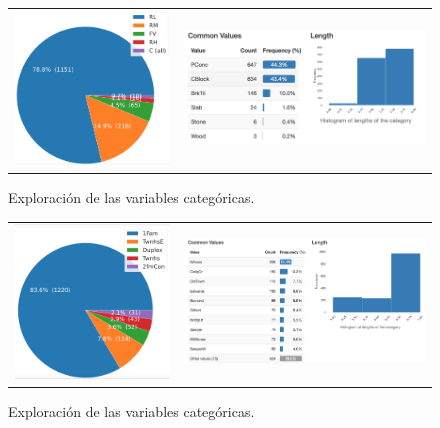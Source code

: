\begin{figure}[H]
	\centering
	\begin{tabular}{cc}
		\includegraphics[width=45mm]{Images/6.1} &   \includegraphics[width=70mm]{Images/6.2}
	\end{tabular}
	\caption{Exploración de las variables categóricas.}
		\label{fig:6}
\end{figure}

\begin{figure}[H]
	\centering
	\begin{tabular}{cc}
		\includegraphics[width=45mm]{Images/6.3} &   \includegraphics[width=70mm]{Images/6.4}
	\end{tabular}
	\caption{Exploración de las variables categóricas.}
		\label{fig:7}
\end{figure}


